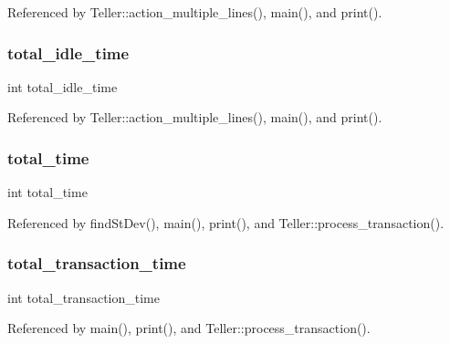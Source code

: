 Referenced by Teller\+::action\+\_\+multiple\+\_\+lines(), main(), and print().

\mbox{\label{teller_8cpp_a3f064cc334d929cb4443e24f629a1cf6}} 
\subsubsection{total\+\_\+idle\+\_\+time}
{\footnotesize\ttfamily int total\+\_\+idle\+\_\+time}



Referenced by Teller\+::action\+\_\+multiple\+\_\+lines(), main(), and print().

\mbox{\label{teller_8cpp_a6754e1cc6922f32fb9afe8b9badcbe6f}} 
\subsubsection{total\+\_\+time}
{\footnotesize\ttfamily int total\+\_\+time}



Referenced by find\+St\+Dev(), main(), print(), and Teller\+::process\+\_\+transaction().

\mbox{\label{teller_8cpp_ae1eb274500513575890cd541b7a24160}} 
\subsubsection{total\+\_\+transaction\+\_\+time}
{\footnotesize\ttfamily int total\+\_\+transaction\+\_\+time}



Referenced by main(), print(), and Teller\+::process\+\_\+transaction().

